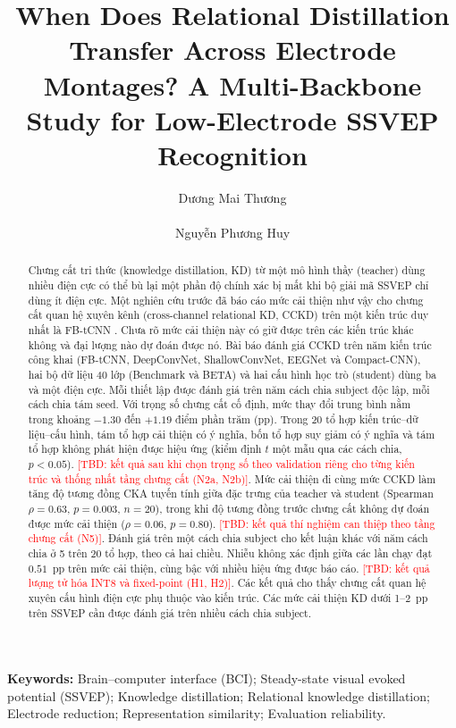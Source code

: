 \documentclass[10pt]{article} %
\title{When Does Relational Distillation Transfer Across Electrode Montages? A Multi-Backbone Study for Low-Electrode SSVEP Recognition}
\author{\name Dương Mai Thương \email \\
      \addr \\
      \AND
      \name Nguyễn Phương Huy \email \\
      \addr }
\newcommand{\tbd}[1]{\textcolor{red}{[TBD: #1]}}
\begin{document}
\renewcommand{\figurename}{Figure}
\renewcommand{\tablename}{Table}
\renewcommand{\refname}{References}
\renewcommand{\abstractname}{Abstract}

\maketitle

\begin{abstract}
Chưng cất tri thức (knowledge distillation, KD) từ một mô hình thầy (teacher) dùng nhiều điện cực có thể bù lại một phần độ chính xác bị mất khi bộ giải mã SSVEP chỉ dùng ít điện cực. Một nghiên cứu trước đã báo cáo mức cải thiện như vậy cho chưng cất quan hệ xuyên kênh (cross-channel relational KD, CCKD) trên một kiến trúc duy nhất là FB-tCNN \citep{icera2026cckd}. Chưa rõ mức cải thiện này có giữ được trên các kiến trúc khác không và đại lượng nào dự đoán được nó. Bài báo đánh giá CCKD trên năm kiến trúc công khai (FB-tCNN, DeepConvNet, ShallowConvNet, EEGNet và Compact-CNN), hai bộ dữ liệu 40 lớp (Benchmark và BETA) và hai cấu hình học trò (student) dùng ba và một điện cực. Mỗi thiết lập được đánh giá trên năm cách chia subject độc lập, mỗi cách chia tám seed. Với trọng số chưng cất cố định, mức thay đổi trung bình nằm trong khoảng $-1.30$ đến $+1.19$ điểm phần trăm (pp). Trong 20 tổ hợp kiến trúc--dữ liệu--cấu hình, tám tổ hợp cải thiện có ý nghĩa, bốn tổ hợp suy giảm có ý nghĩa và tám tổ hợp không phát hiện được hiệu ứng (kiểm định $t$ một mẫu qua các cách chia, $p<0.05$). \tbd{kết quả sau khi chọn trọng số theo validation riêng cho từng kiến trúc và thống nhất tầng chưng cất (N2a, N2b)}. Mức cải thiện đi cùng mức CCKD làm tăng độ tương đồng CKA tuyến tính giữa đặc trưng của teacher và student (Spearman $\rho=0.63$, $p=0.003$, $n=20$), trong khi độ tương đồng trước chưng cất không dự đoán được mức cải thiện ($\rho=0.06$, $p=0.80$). \tbd{kết quả thí nghiệm can thiệp theo tầng chưng cất (N5)}. Đánh giá trên một cách chia subject cho kết luận khác với năm cách chia ở 5 trên 20 tổ hợp, theo cả hai chiều. Nhiễu không xác định giữa các lần chạy đạt $0.51$~pp trên mức cải thiện, cùng bậc với nhiều hiệu ứng được báo cáo. \tbd{kết quả lượng tử hóa INT8 và fixed-point (H1, H2)}. Các kết quả cho thấy chưng cất quan hệ xuyên cấu hình điện cực phụ thuộc vào kiến trúc. Các mức cải thiện KD dưới 1--2~pp trên SSVEP cần được đánh giá trên nhiều cách chia subject.
\end{abstract}

\textbf{Keywords:} Brain--computer interface (BCI); Steady-state visual evoked potential (SSVEP); Knowledge distillation; Relational knowledge distillation; Electrode reduction; Representation similarity; Evaluation reliability.
\end{document}
